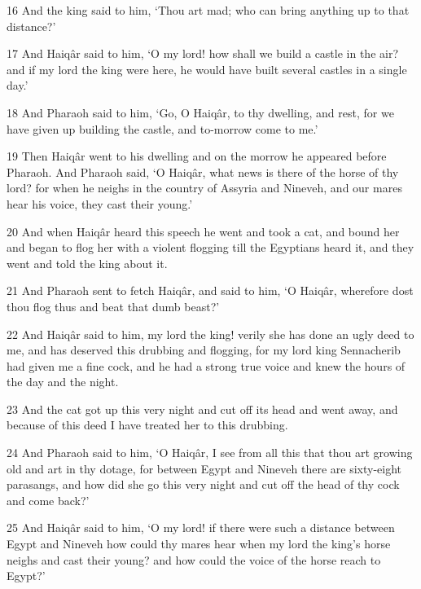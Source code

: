 \par 16 And the king said to him, ‘Thou art mad; who can bring anything up to that distance?’

\par 17 And Haiqâr said to him, ‘O my lord! how shall we build a castle in the air? and if my lord the king were here, he would have built several castles in a single day.’

\par 18 And Pharaoh said to him, ‘Go, O Haiqâr, to thy dwelling, and rest, for we have given up building the castle, and to-morrow come to me.’

\par 19 Then Haiqâr went to his dwelling and on the morrow he appeared before Pharaoh. And Pharaoh said, ‘O Haiqâr, what news is there of the horse of thy lord? for when he neighs in the country of Assyria and Nineveh, and our mares hear his voice, they cast their young.’

\par 20 And when Haiqâr heard this speech he went and took a cat, and bound her and began to flog her with a violent flogging till the Egyptians heard it, and they went and told the king about it.

\par 21 And Pharaoh sent to fetch Haiqâr, and said to him, ‘O Haiqâr, wherefore dost thou flog thus and beat that dumb beast?’

\par 22 And Haiqâr said to him, my lord the king! verily she has done an ugly deed to me, and has deserved this drubbing and flogging, for my lord king Sennacherib had given me a fine cock, and he had a strong true voice and knew the hours of the day and the night.

\par 23 And the cat got up this very night and cut off its head and went away, and because of this deed I have treated her to this drubbing.

\par 24 And Pharaoh said to him, ‘O Haiqâr, I see from all this that thou art growing old and art in thy dotage, for between Egypt and Nineveh there are sixty-eight parasangs, and how did she go this very night and cut off the head of thy cock and come back?’

\par 25 And Haiqâr said to him, ‘O my lord! if there were such a distance between Egypt and Nineveh how could thy mares hear when my lord the king's horse neighs and cast their young? and how could the voice of the horse reach to Egypt?’

